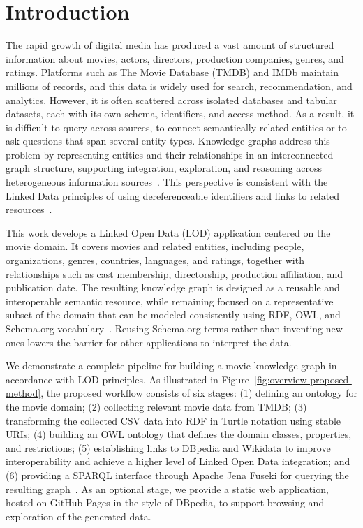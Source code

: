 \section{Introduction}
The rapid growth of digital media has produced a vast amount of structured information about movies, actors, directors, production companies, genres, and ratings. Platforms such as The Movie Database (TMDB) and IMDb maintain millions of records, and this data is widely used for search, recommendation, and analytics. However, it is often scattered across isolated databases and tabular datasets, each with its own schema, identifiers, and access method. As a result, it is difficult to query across sources, to connect semantically related entities or to ask questions that span several entity types. Knowledge graphs address this problem by representing entities and their relationships in an interconnected graph structure, supporting integration, exploration, and reasoning across heterogeneous information sources~\citep{hogan2021knowledge}. This perspective is consistent with the Linked Data principles of using dereferenceable identifiers and links to related resources~\citep{bernerslee2006linkeddata}.

This work develops a Linked Open Data (LOD) application centered on the movie domain. It covers movies and related entities, including people, organizations, genres, countries, languages, and ratings, together with relationships such as cast membership, directorship, production affiliation, and publication date. The resulting knowledge graph is designed as a reusable and interoperable semantic resource, while remaining focused on a representative subset of the domain that can be modeled consistently using RDF, OWL, and Schema.org vocabulary~\citep{schemaorg2025,w3c2014rdf11}. Reusing Schema.org terms rather than inventing new ones lowers the barrier for other applications to interpret the data.

We demonstrate a complete pipeline for building a movie knowledge graph in accordance with LOD principles. As illustrated in Figure~\ref{fig:overview-proposed-method}, the proposed workflow consists of six stages: (1) defining an ontology for the movie domain; (2) collecting relevant movie data from TMDB; (3) transforming the collected CSV data into RDF in Turtle notation using stable URIs; (4) building an OWL ontology that defines the domain classes, properties, and restrictions; (5) establishing links to DBpedia and Wikidata to improve interoperability and achieve a higher level of Linked Open Data integration; and (6) providing a SPARQL interface through Apache Jena Fuseki for querying the resulting graph~\citep{w3c2013sparql}. As an optional stage, we provide a static web application, hosted on GitHub Pages in the style of DBpedia, to support browsing and exploration of the generated data.

